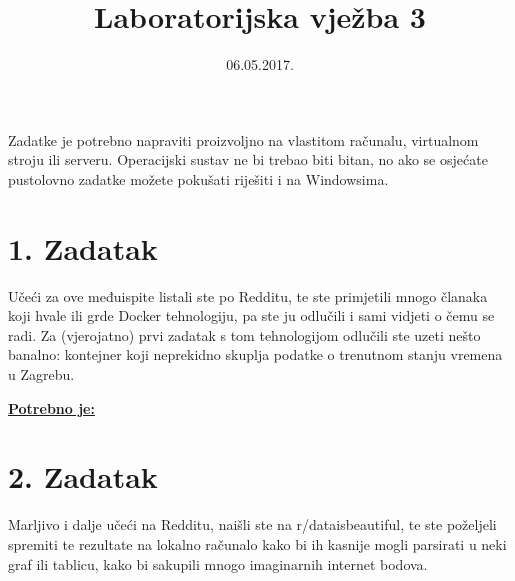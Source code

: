 \documentclass[12pt,a4paper]{article}
\begin{document}
	\title{Laboratorijska vježba 3}
	\date{\vspace{-5ex} 06.05.2017.}
	\maketitle

Zadatke je potrebno napraviti proizvoljno na vlastitom računalu, virtualnom stroju ili serveru. Operacijski sustav ne bi trebao biti bitan, no ako se osjećate pustolovno zadatke možete pokušati riješiti i na Windowsima.

\section*{1. Zadatak}

Učeći za ove međuispite listali ste po Redditu, te ste primjetili mnogo članaka koji hvale ili grde Docker tehnologiju, pa ste ju odlučili i sami vidjeti o čemu se radi. Za (vjerojatno) prvi zadatak s tom tehnologijom odlučili ste uzeti nešto banalno: kontejner koji neprekidno skuplja podatke o trenutnom stanju vremena u Zagrebu.

\underline{\textbf{Potrebno je:}}


\newpage


\section*{2. Zadatak}

Marljivo i dalje učeći na Redditu, naišli ste na r/dataisbeautiful, te ste poželjeli spremiti te rezultate na lokalno računalo kako bi ih kasnije mogli parsirati u neki graf ili tablicu, kako bi sakupili mnogo imaginarnih internet bodova. 
\end{document}
